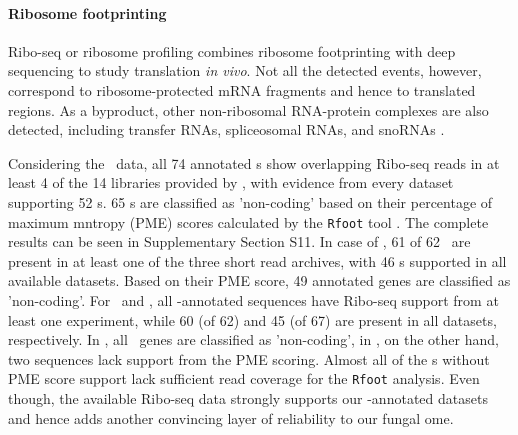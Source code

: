 \paragraph{\textbf{Ribosome footprinting}}
Ribo-seq or ribosome profiling combines ribosome footprinting with deep
sequencing \cite{Ingolia:2009,Ingolia:2012} to study translation \textit{in
  vivo}. Not all the detected events, however, correspond to
ribosome-protected mRNA fragments and hence to translated regions.  As a
byproduct, other non-ribosomal RNA-protein complexes are also detected,
including transfer RNAs, spliceosomal RNAs, and snoRNAs \cite{Ingolia:2014,
  Ji:2016}.

Considering the \sce\ data, all 74 annotated \sno s show overlapping
Ribo-seq reads in at least 4 of the 14 libraries provided by
\cite{Ingolia:2009}, with evidence from every dataset supporting 52 \sno
s. 65 \sno s are classified as 'non-coding' based on their percentage of
maximum mntropy (PME) scores calculated by the \texttt{Rfoot} tool
\cite{Ji:2016}. The complete results can be seen in Supplementary Section
S11. In case of \spo, 61 of 62 \sno\ are present in at least one of the
three short read archives, with 46 \sno s supported in all available
datasets. Based on their PME score, 49 annotated genes are classified as
'non-coding'. For \aca\ and \calb , all \snostrip -annotated sequences have
Ribo-seq support from at least one experiment, while 60 (of 62) and 45 (of
67) are present in all datasets, respectively. In \aca, all \sno\ genes are
classified as 'non-coding', in \calb, on the other hand, two sequences lack
support from the PME scoring. Almost all of the \sno s without PME score
support lack sufficient read coverage for the \texttt{Rfoot} analysis.
Even though, the available Ribo-seq data strongly supports our \snostrip
-annotated datasets and hence adds another convincing layer of reliability
to our fungal \sno ome.  

%
%
%

